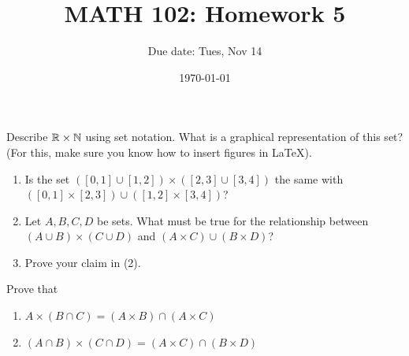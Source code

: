 \documentclass[12pt]{amsart}
\title{ MATH 102: Homework 5}
\author{Due date: Tues, Nov 14}
\date{\today}
\begin{document}
\maketitle

\begin{problem}
    Describe $\mathbb{R} \times \mathbb{N}$ using set notation.
    What is a graphical representation of this set? (For this, make sure you know
    how to insert figures in LaTeX).
\end{problem}


\begin{problem}
    \begin{enumerate}
        \item Is the set $([0,1] \cup [1,2]) \times ([2,3] \cup [3,4])$ the same with 
    $([0,1]\times [2,3])\cup ([1,2]\times [3,4])$?
        \item Let  $A,B,C,D$ be sets. What must be true for the relationship between $(A\cup B) \times (C\cup D)$
    and $(A\times C) \cup (B\times D)$?
        \item Prove your claim in (2).
    \end{enumerate}
\end{problem}

\begin{problem}
    Prove that 
    \begin{enumerate}
        \item $A \times (B\cap C) =  (A\times B) \cap (A \times C)$
        \item $(A\cap B) \times (C\cap D)= (A\times C) \cap (B\times D)$
    \end{enumerate}
\end{problem}
\end{document}
